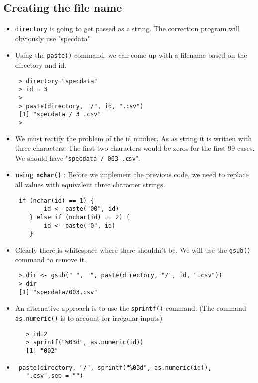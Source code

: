 \documentclass[12pt]{article}
\begin{document}
 \subsection{Creating the file name}
 \begin{itemize}
  \item \texttt{directory} is going to get passed as a string. The correction program will obviously use "specdata"
  \item Using the \texttt{paste()} command, we can come up with a filename based on the directory and id.
 \begin{verbatim}
 > directory="specdata"
 > id = 3
 > 
 > paste(directory, "/", id, ".csv")
 [1] "specdata / 3 .csv"
 > 
 \end{verbatim}
  \item We must rectify the problem of the id number. As as string it is written with three characters. The first two characters would be zeros for the first 99 cases.
 We should have "\texttt{specdata / 003 .csv}".
 \item \textbf{using \texttt{nchar()}} : Before we implement the previous code, we need to replace all values with equivalent three character strings.
 \begin{verbatim}
 if (nchar(id) == 1) {
    	id <- paste("00", id)
    } else if (nchar(id) == 2) {
    	id <- paste("0", id)
    }
 \end{verbatim}

 \item Clearly there is whitespace where there shouldn't be. We will use the \texttt{gsub()} command to remove it. 
 \begin{verbatim}
 > dir <- gsub(" ", "", paste(directory, "/", id, ".csv"))
 > dir
 [1] "specdata/003.csv"
  \end{verbatim}
\newpage
   \item An alternative approach is to use the \texttt{sprintf()} command. (The command \texttt{as.numeric()} is to account for irregular inputs)
   \begin{verbatim}
   > id=2
   > sprintf("%03d", as.numeric(id))
   [1] "002"
   \end{verbatim}
   
 \item 
 \begin{framed}
 \begin{verbatim}
 paste(directory, "/", sprintf("%03d", as.numeric(id)),
   ".csv",sep = "")
 \end{verbatim}
 \end{framed}
 \end{itemize}
 \newpage
\end{document}
